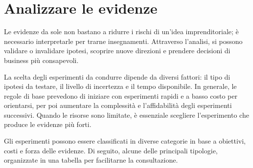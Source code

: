 \section{Analizzare le evidenze}
Le evidenze da sole non bastano a ridurre i rischi di un’idea imprenditoriale; è necessario interpretarle per trarne insegnamenti. Attraverso l’analisi, si possono validare o invalidare ipotesi, scoprire nuove direzioni e prendere decisioni di business più consapevoli.

La scelta degli esperimenti da condurre dipende da diversi fattori: il tipo di ipotesi da testare, il livello di incertezza e il tempo disponibile. In generale, le regole di base prevedono di iniziare con esperimenti rapidi e a basso costo per orientarsi, per poi aumentare la complessità e l’affidabilità degli esperimenti successivi. Quando le risorse sono limitate, è essenziale scegliere l’esperimento che produce le evidenze più forti.

Gli esperimenti possono essere classificati in diverse categorie in base a obiettivi, costi e forza delle evidenze. Di seguito, alcune delle principali tipologie, organizzate in una tabella per facilitarne la consultazione.

